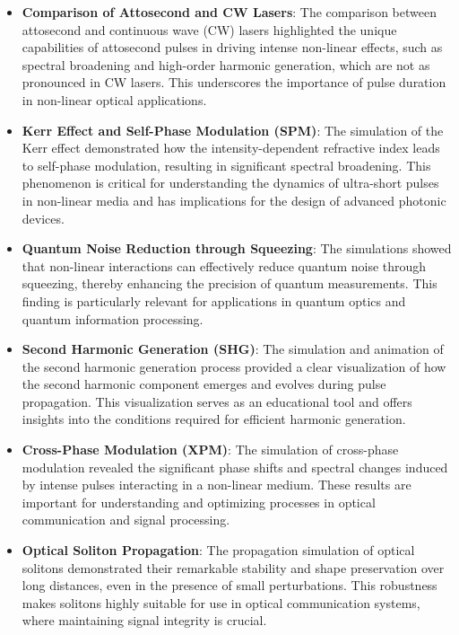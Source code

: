 \documentclass[12pt]{article}
\begin{document}
\begin{itemize}
    \item \textbf{Comparison of Attosecond and CW Lasers}: The comparison between attosecond and continuous wave (CW) lasers highlighted the unique capabilities of attosecond pulses in driving intense non-linear effects, such as spectral broadening and high-order harmonic generation, which are not as pronounced in CW lasers. This underscores the importance of pulse duration in non-linear optical applications.
    
    \item \textbf{Kerr Effect and Self-Phase Modulation (SPM)}: The simulation of the Kerr effect demonstrated how the intensity-dependent refractive index leads to self-phase modulation, resulting in significant spectral broadening. This phenomenon is critical for understanding the dynamics of ultra-short pulses in non-linear media and has implications for the design of advanced photonic devices.

    \item \textbf{Quantum Noise Reduction through Squeezing}: The simulations showed that non-linear interactions can effectively reduce quantum noise through squeezing, thereby enhancing the precision of quantum measurements. This finding is particularly relevant for applications in quantum optics and quantum information processing.

    \item \textbf{Second Harmonic Generation (SHG)}: The simulation and animation of the second harmonic generation process provided a clear visualization of how the second harmonic component emerges and evolves during pulse propagation. This visualization serves as an educational tool and offers insights into the conditions required for efficient harmonic generation.

    \item \textbf{Cross-Phase Modulation (XPM)}: The simulation of cross-phase modulation revealed the significant phase shifts and spectral changes induced by intense pulses interacting in a non-linear medium. These results are important for understanding and optimizing processes in optical communication and signal processing.

    \item \textbf{Optical Soliton Propagation}: The propagation simulation of optical solitons demonstrated their remarkable stability and shape preservation over long distances, even in the presence of small perturbations. This robustness makes solitons highly suitable for use in optical communication systems, where maintaining signal integrity is crucial.
    
\end{itemize}
\end{document}
